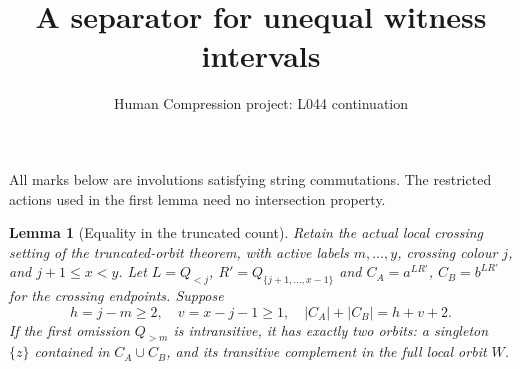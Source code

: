\documentclass[11pt,a4paper]{article}
\title{A separator for unequal witness intervals}
\author{Human Compression project: L044 continuation}
\date{}
\newtheorem{lemma}{Lemma}
\begin{document}
\maketitle
All marks below are involutions satisfying string
commutations. The restricted actions used in the
first lemma need no intersection property.

\begin{lemma}[Equality in the truncated count]
Retain the actual local crossing setting of the
truncated-orbit theorem, with active labels
$m,\ldots,y$, crossing colour $j$, and
$j+1\le x<y$. Let $L=Q_{<j}$,
$R'=Q_{\{j+1,\ldots,x-1\}}$ and
$C_A=a^{LR'}$, $C_B=b^{LR'}$ for the crossing
endpoints. Suppose
\[
 h=j-m\ge2,\quad v=x-j-1\ge1,\quad
                  |C_A|+|C_B|=h+v+2.
\]
If the first omission $Q_{>m}$ is intransitive,
it has exactly two orbits: a singleton $\{z\}$
contained in $C_A\cup C_B$, and its transitive
complement in the full local orbit $W$.
\end{lemma}
\end{document}
